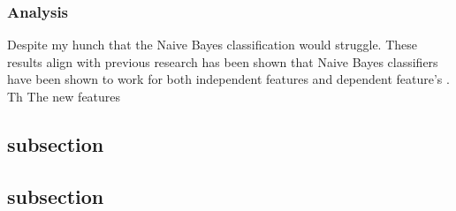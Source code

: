 \documentclass[a4paper]{article}
\begin{document}
\subsubsection{Analysis}
Despite my hunch that the Naive Bayes classification would struggle. These results align with previous research has been shown that Naive Bayes classifiers have been shown to work for both independent features and dependent feature's \cite{rish2001empirical}.
Th
The new features

\subsection{subsection}

\subsection{subsection}




\end{document}
